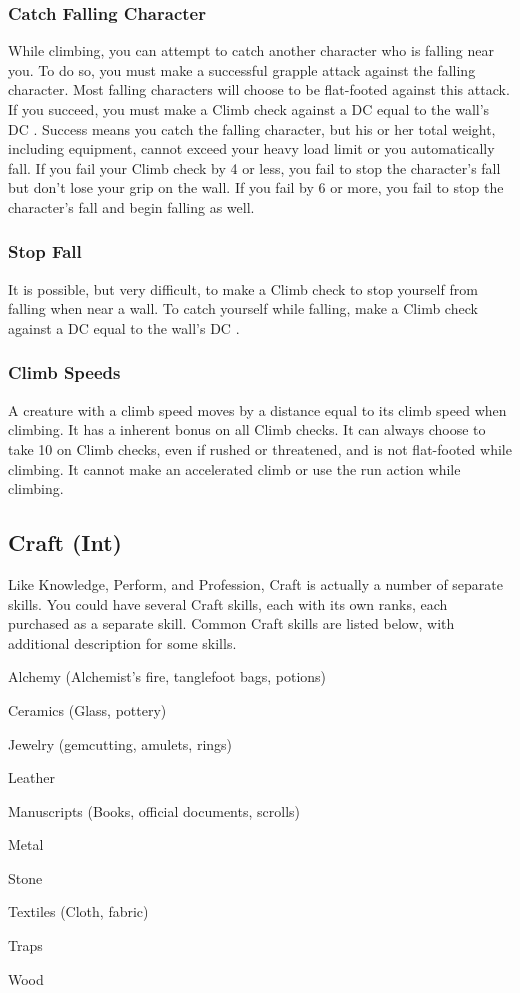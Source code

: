 \subsubsection{Catch Falling Character}
While climbing, you can attempt to catch another character who is falling near you. To do so, you must make a successful grapple attack against the falling character. Most falling characters will choose to be flat-footed against this attack. If you succeed, you must make a Climb check against a DC equal to the wall's DC . Success means you catch the falling character, but his or her total weight, including equipment, cannot exceed your heavy load limit or you automatically fall. If you fail your Climb check by 4 or less, you fail to stop the character's fall but don't lose your grip on the wall. If you fail by 6 or more, you fail to stop the character's fall and begin falling as well.

\subsubsection{Stop Fall}
It is possible, but very difficult, to make a Climb check to stop yourself from falling when near a wall. To catch yourself while falling, make a Climb check against a DC equal to the wall's DC .

\subsubsection{Climb Speeds}
A creature with a climb speed moves by a distance equal to its climb speed when climbing. It has a  inherent bonus on all Climb checks. It can always choose to take 10 on Climb checks, even if rushed or threatened, and is not flat-footed while climbing. It cannot make an accelerated climb or use the run action while climbing.

\subsection{Craft (Int)}
Like Knowledge, Perform, and Profession, Craft is actually a number of separate skills. You could have several Craft skills, each with its own ranks, each purchased as a separate skill. Common Craft skills are listed below, with additional description for some skills.

\begin{itemize*}
  \item Alchemy (Alchemist's fire, tanglefoot bags, potions)
  \item Ceramics (Glass, pottery)
  \item Jewelry (gemcutting, amulets, rings)
  \item Leather
  \item Manuscripts (Books, official documents, scrolls)
  \item Metal
  \item Stone
  \item Textiles (Cloth, fabric)
  \item Traps
  \item Wood
\end{itemize*}

